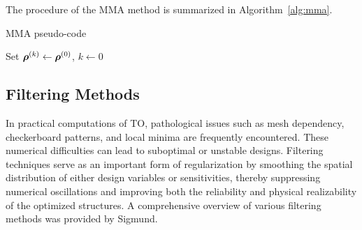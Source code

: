 \documentclass[mathpazo]{cicp}
\begin{document}
The procedure of the MMA method is summarized in Algorithm~\ref{alg:mma}.
\vspace{-1ex} %
\begin{algorithm}[H]
	\caption{MMA pseudo-code}
	\label{alg:mma}
	\begin{minipage}{\textwidth}
		Set $\boldsymbol{\rho}^{(k)} \leftarrow \boldsymbol{\rho}^{(0)}$, $k \leftarrow 0$\;
		
	\end{minipage}
\end{algorithm}
\vspace{-1ex} %

\subsection{Filtering Methods}
In practical computations of TO, pathological issues such as mesh dependency, checkerboard patterns, and local minima are frequently encountered\cite{bendsoe2013topology}. These numerical difficulties can lead to suboptimal or unstable designs. Filtering techniques serve as an important form of regularization by smoothing the spatial distribution of either design variables or sensitivities, thereby suppressing numerical oscillations and improving both the reliability and physical realizability of the optimized structures\cite{sigmund1998numerical}. A comprehensive overview of various filtering methods was provided by Sigmund\cite{sigmund2007morphology}. 
\end{document}
